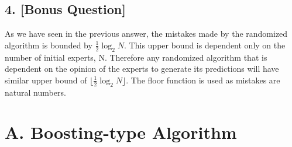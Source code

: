 \documentclass{article}
\begin{document}
\subsection*{4. [Bonus Question]}
As we have seen in the previous answer, the mistakes made by the randomized algorithm is bounded by \( \frac{1}{2}\log_2{N} \).  This upper bound is dependent only on the number of initial experts, N.  Therefore any randomized algorithm that is dependent on the opinion of the experts to generate its predictions will have similar upper bound of \( \lfloor \frac{1}{2}\log_2{N} \rfloor \).  The floor function is used as mistakes are natural numbers.

\section*{A. Boosting-type Algorithm}
\end{document}
